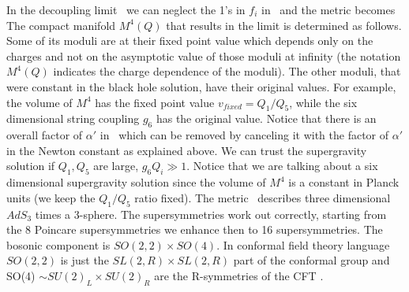 In the decoupling limit \lowenlim\
 we can neglect the 1's in $f_i$ in \fdbh\
and  the metric becomes 
\eqn{}
The compact manifold $M^4(Q)$ that results in the limit is determined as follows.
Some  of its 
moduli 
are at their fixed point value which depends only on the
charges and not on the asymptotic value of those moduli 
at infinity (the notation $M^4(Q)$ 
indicates the charge dependence of the moduli)\ferrarafm {}. 
The other moduli, that were constant in the black hole solution, have 
their original  values. 
For example, the volume of $M^4$ 
has the  fixed point value $v_{fixed}  = 
Q_1/Q_5$, while the six dimensional string coupling $g_6$ has the 
original value.  
Notice that there is an overall factor of $\alpha'$ in \fdbh\  which can  be 
removed by canceling it with the factor of $\alpha'$ in the 
Newton constant as explained above.  
We can trust the supergravity solution if 
 $Q_1, Q_5$  are  large,  $g_6  Q_i \gg 1$. 
Notice that we are talking about a six dimensional 
supergravity solution since the volume of $M^4$ is a constant
in Planck units (we keep the $Q_1/Q_5$ ratio fixed). 
The metric \fdbh\ describes three dimensional $AdS_3$ times a 3-sphere.
The supersymmetries work out correctly, starting from the 8 Poincare 
supersymmetries 
we enhance then to 16 supersymmetries. The bosonic component
is  $SO(2,2) \times SO(4)$. In conformal field theory language
$SO(2,2)$ is just the $SL(2,R) \times  SL(2,R)$ 
part of the conformal group and
SO(4) $\sim SU(2)_L \times SU(2)_R $ are the R-symmetries of the CFT \spin .

